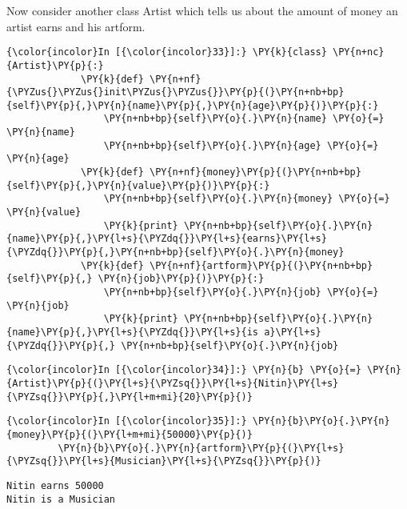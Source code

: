     Now consider another class Artist which tells us about the amount of
money an artist earns and his artform.

    \begin{Verbatim}[commandchars=\\\{\}]
{\color{incolor}In [{\color{incolor}33}]:} \PY{k}{class} \PY{n+nc}{Artist}\PY{p}{:}
             \PY{k}{def} \PY{n+nf}{\PYZus{}\PYZus{}init\PYZus{}\PYZus{}}\PY{p}{(}\PY{n+nb+bp}{self}\PY{p}{,}\PY{n}{name}\PY{p}{,}\PY{n}{age}\PY{p}{)}\PY{p}{:}
                 \PY{n+nb+bp}{self}\PY{o}{.}\PY{n}{name} \PY{o}{=} \PY{n}{name}
                 \PY{n+nb+bp}{self}\PY{o}{.}\PY{n}{age} \PY{o}{=} \PY{n}{age}
             \PY{k}{def} \PY{n+nf}{money}\PY{p}{(}\PY{n+nb+bp}{self}\PY{p}{,}\PY{n}{value}\PY{p}{)}\PY{p}{:}
                 \PY{n+nb+bp}{self}\PY{o}{.}\PY{n}{money} \PY{o}{=} \PY{n}{value}
                 \PY{k}{print} \PY{n+nb+bp}{self}\PY{o}{.}\PY{n}{name}\PY{p}{,}\PY{l+s}{\PYZdq{}}\PY{l+s}{earns}\PY{l+s}{\PYZdq{}}\PY{p}{,}\PY{n+nb+bp}{self}\PY{o}{.}\PY{n}{money}
             \PY{k}{def} \PY{n+nf}{artform}\PY{p}{(}\PY{n+nb+bp}{self}\PY{p}{,} \PY{n}{job}\PY{p}{)}\PY{p}{:}
                 \PY{n+nb+bp}{self}\PY{o}{.}\PY{n}{job} \PY{o}{=} \PY{n}{job}
                 \PY{k}{print} \PY{n+nb+bp}{self}\PY{o}{.}\PY{n}{name}\PY{p}{,}\PY{l+s}{\PYZdq{}}\PY{l+s}{is a}\PY{l+s}{\PYZdq{}}\PY{p}{,} \PY{n+nb+bp}{self}\PY{o}{.}\PY{n}{job}
\end{Verbatim}

    \begin{Verbatim}[commandchars=\\\{\}]
{\color{incolor}In [{\color{incolor}34}]:} \PY{n}{b} \PY{o}{=} \PY{n}{Artist}\PY{p}{(}\PY{l+s}{\PYZsq{}}\PY{l+s}{Nitin}\PY{l+s}{\PYZsq{}}\PY{p}{,}\PY{l+m+mi}{20}\PY{p}{)}
\end{Verbatim}

    \begin{Verbatim}[commandchars=\\\{\}]
{\color{incolor}In [{\color{incolor}35}]:} \PY{n}{b}\PY{o}{.}\PY{n}{money}\PY{p}{(}\PY{l+m+mi}{50000}\PY{p}{)}
         \PY{n}{b}\PY{o}{.}\PY{n}{artform}\PY{p}{(}\PY{l+s}{\PYZsq{}}\PY{l+s}{Musician}\PY{l+s}{\PYZsq{}}\PY{p}{)}
\end{Verbatim}

    \begin{Verbatim}[commandchars=\\\{\}]
Nitin earns 50000
Nitin is a Musician
    \end{Verbatim}

